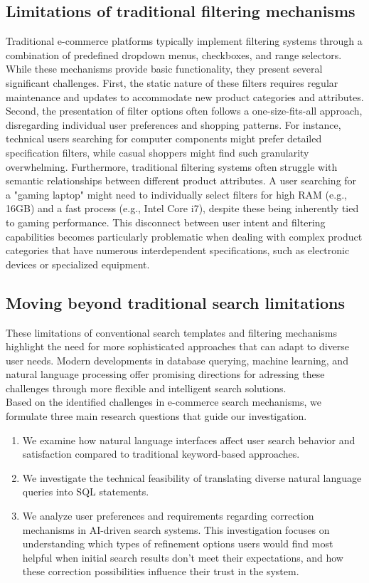 \documentclass[../../submission.tex]{subfiles}
\begin{document}
\subsection{Limitations of traditional filtering mechanisms}
Traditional e-commerce platforms typically implement filtering systems through a combination of 
predefined dropdown menus, checkboxes, and range selectors. While these mechanisms provide basic 
functionality, they present several significant challenges. First, the static nature of these 
filters requires regular maintenance and updates to accommodate new product categories and attributes. 
Second, the presentation of filter options often follows a one-size-fits-all approach, disregarding 
individual user preferences and shopping patterns. For instance, technical users searching for computer 
components might prefer detailed specification filters, while casual shoppers might find such granularity 
overwhelming. Furthermore, traditional filtering systems often struggle with semantic relationships between 
different product attributes. A user searching for a "gaming laptop" might need to individually select filters
for high RAM (e.g., 16GB) and a fast process (e.g., Intel Core i7), despite these being inherently tied to 
gaming performance. This disconnect between user intent and filtering 
capabilities becomes particularly problematic when dealing with complex product categories that 
have numerous interdependent specifications, such as electronic devices or specialized equipment.

\subsection{Moving beyond traditional search limitations}
These limitations of conventional search templates and filtering mechanisms highlight 
the need for more sophisticated approaches that can adapt to diverse user needs. 
Modern developments in database querying, machine learning, and natural language processing 
offer promising directions for adressing these challenges through more flexible and 
intelligent search solutions.\\
Based on the identified challenges in e-commerce search mechanisms, we formulate three main research 
questions that guide our investigation.
\begin{enumerate}
    \item We examine how natural language interfaces affect user search behavior and satisfaction 
    compared to traditional keyword-based approaches.
    \item We investigate the technical feasibility of translating diverse natural language queries into SQL statements.
    \item We analyze user preferences and requirements regarding correction mechanisms in AI-driven search systems. 
    This investigation focuses on understanding which types of refinement options users would find most helpful when 
    initial search results don't meet their expectations, and how these correction possibilities influence their trust 
    in the system.
\end{enumerate}
\end{document}
